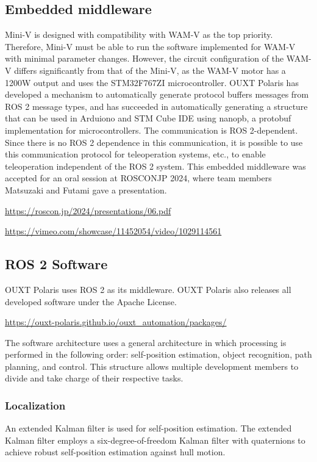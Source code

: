 \documentclass[lettersize,journal]{IEEEtran}
\begin{document}
\subsection{Embedded middleware}

Mini-V is designed with compatibility with WAM-V as the top priority.
Therefore, Mini-V must be able to run the software implemented for WAM-V with minimal parameter changes.
However, the circuit configuration of the WAM-V differs significantly from that of the Mini-V, as the WAM-V motor has a 1200W output and uses the STM32F767ZI microcontroller.
OUXT Polaris has developed a mechanism to automatically generate protocol buffers messages from ROS 2 message types, and has succeeded in automatically generating a structure that can be used in Arduiono and STM Cube IDE using nanopb, a protobuf implementation for microcontrollers. The communication is ROS 2-dependent.
Since there is no ROS 2 dependence in this communication, it is possible to use this communication protocol for teleoperation systems, etc., to enable teleoperation independent of the ROS 2 system.
This embedded middleware was accepted for an oral session at ROSCONJP 2024, where team members Matsuzaki and Futami gave a presentation.

\url{https://roscon.jp/2024/presentations/06.pdf}

\url{https://vimeo.com/showcase/11452054/video/1029114561}

\subsection{ROS 2 Software}

OUXT Polaris uses ROS 2 as its middleware.
OUXT Polaris also releases all developed software under the Apache License.

\url{https://ouxt-polaris.github.io/ouxt_automation/packages/}

The software architecture uses a general architecture in which processing is performed in the following order: self-position estimation, object recognition, path planning, and control.
This structure allows multiple development members to divide and take charge of their respective tasks.

\subsubsection{Localization}

An extended Kalman filter is used for self-position estimation.
The extended Kalman filter employs a six-degree-of-freedom Kalman filter with quaternions to achieve robust self-position estimation against hull motion.
\end{document}
